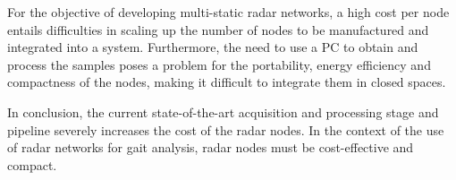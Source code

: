 For the objective of developing multi-static radar networks, a high cost per node entails difficulties in scaling up the number of nodes to be manufactured and integrated into a system. Furthermore, the need to use a PC to obtain and process the samples poses a problem for the portability, energy efficiency and compactness of the nodes, making it difficult to integrate them in closed spaces.

In conclusion, the current state-of-the-art acquisition and processing stage and pipeline severely increases the cost of the radar nodes. In the context of the use of radar networks for gait analysis, radar nodes must be cost-effective and compact.

